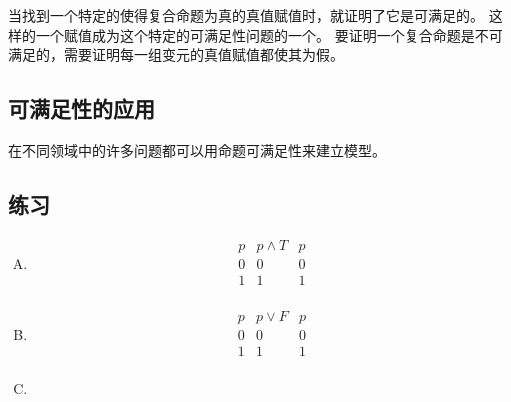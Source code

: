 {{        当找到一个特定的使得复合命题为真的真值赋值时，就证明了它是可满足的。
        这样的一个赋值成为这个特定的可满足性问题的一个。
        要证明一个复合命题是不可满足的，需要证明每一组变元的真值赋值都使其为假。
    }

    \subsection{可满足性的应用}
    {
        在不同领域中的许多问题都可以用命题可满足性来建立模型。
    }

    \subsection{练习}
    {
        \begin{practices}
            \begin{enumerate}[A.]
                \item
                {
                    \begin{table}[H]
                        \[
                            \begin{array}{c|c|c}
                                \hline
                                p & p \wedge T & p \\
                                \hline
                                0 & 0 & 0 \\
                                1 & 1 & 1 \\
                            \end{array}
                        \]
                    \end{table}
                }
                \item
                {
                    \begin{table}[H]
                        \[
                            \begin{array}{c|c|c}
                                \hline
                                p & p \vee F & p \\
                                \hline
                                0 & 0 & 0 \\
                                1 & 1 & 1 \\
                            \end{array}
                        \]
                    \end{table}
                }
                \item

\end{enumerate}
\end{practices}}}
